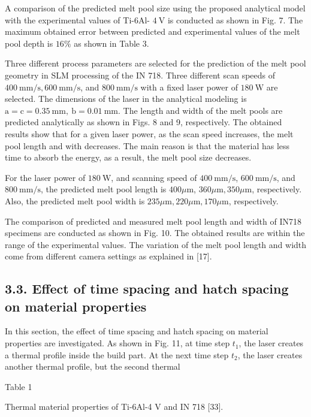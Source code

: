 \documentclass[10pt]{article}
\begin{document}
A comparison of the predicted melt pool size using the proposed analytical model with the experimental values of Ti-6Al- $4 \mathrm{~V}$ is conducted as shown in Fig. 7. The maximum obtained error between predicted and experimental values of the melt pool depth is $16 \%$ as shown in Table 3.

Three different process parameters are selected for the prediction of the melt pool geometry in SLM processing of the IN 718. Three different scan speeds of $400 \mathrm{~mm} / \mathrm{s}, 600 \mathrm{~mm} / \mathrm{s}$, and $800 \mathrm{~mm} / \mathrm{s}$ with a fixed laser power of $180 \mathrm{~W}$ are selected. The dimensions of the laser in the analytical modeling is $\mathrm{a}=\mathrm{c}=0.35 \mathrm{~mm}, \mathrm{~b}=0.01 \mathrm{~mm}$. The length and width of the melt pools are predicted analytically as shown in Figs. 8 and 9, respectively. The obtained results show that for a given laser power, as the scan speed increases, the melt pool length and with decreases. The main reason is that the material has less time to absorb the energy, as a result, the melt pool size decreases.

For the laser power of $180 \mathrm{~W}$, and scanning speed of $400 \mathrm{~mm} / \mathrm{s}$, $600 \mathrm{~mm} / \mathrm{s}$, and $800 \mathrm{~mm} / \mathrm{s}$, the predicted melt pool length is $400 \mu \mathrm{m}$, $360 \mu \mathrm{m}, 350 \mu \mathrm{m}$, respectively. Also, the predicted melt pool width is $235 \mu \mathrm{m}, 220 \mu \mathrm{m}, 170 \mu \mathrm{m}$, respectively.

The comparison of predicted and measured melt pool length and width of IN718 specimens are conducted as shown in Fig. 10. The obtained results are within the range of the experimental values. The variation of the melt pool length and width come from different camera settings as explained in [17].

\subsection*{3.3. Effect of time spacing and hatch spacing on material properties}
In this section, the effect of time spacing and hatch spacing on material properties are investigated. As shown in Fig. 11, at time step $t_{1}$, the laser creates a thermal profile inside the build part. At the next time step $t_{2}$, the laser creates another thermal profile, but the second thermal

Table 1

Thermal material properties of Ti-6Al-4 V and IN 718 [33].
\end{document}
